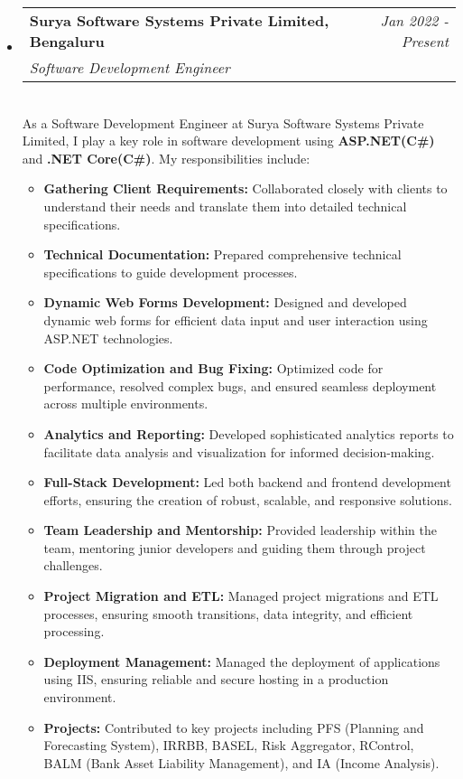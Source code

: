 \documentclass[a4paper,12pt]{article}
\makeatletter
\newcommand{\resumeSubHeadingListStart}{\begin{itemize}[leftmargin=*,labelsep=1mm,noitemsep]}
\newcommand{\resumeSubHeadingListEnd}{\end{itemize}\vspace{2mm}}
\newcommand{\resumeItemListStart}{\begin{itemize}[leftmargin=3ex, rightmargin=2ex, noitemsep,labelsep=1.2mm,itemsep=0mm]\small}
\newcommand{\resumeItemListEnd}{\end{itemize}\vspace{-2mm}}
\newcommand{\resumeExperience}[4]{
\vspace{0.5mm}\item
    \begin{tabular*}{0.98\textwidth}[t]{l@{\extracolsep{\fill}}r}
        \textbf{#1} & \textit{\footnotesize{#3}}\\
        \textit{\footnotesize{#2}} & {}
    \end{tabular*}\\ [1mm]
    \footnotesize{#4}
}
\newcommand{\emptyLine}{\\[-3mm]}
\makeatother
\begin{document}
\resumeSubHeadingListStart
\resumeExperience {Surya Software Systems Private Limited, Bengaluru}
 {Software Development Engineer} {Jan 2022 - Present}
{
As a Software Development Engineer at Surya Software Systems Private Limited, I play a key role in software development using \textbf{ASP.NET(C\#)} and \textbf{.NET Core(C\#)}. My responsibilities include:
}\emptyLine
\resumeItemListStart
    \item \textbf{Gathering Client Requirements:} Collaborated closely with clients to understand their needs and translate them into detailed technical specifications.
    \item \textbf{Technical Documentation:} Prepared comprehensive technical specifications to guide development processes.
    \item \textbf{Dynamic Web Forms Development:} Designed and developed dynamic web forms for efficient data input and user interaction using ASP.NET technologies.
    \item \textbf{Code Optimization and Bug Fixing:} Optimized code for performance, resolved complex bugs, and ensured seamless deployment across multiple environments.
    \item \textbf{Analytics and Reporting:} Developed sophisticated analytics reports to facilitate data analysis and visualization for informed decision-making.
    \item \textbf{Full-Stack Development:} Led both backend and frontend development efforts, ensuring the creation of robust, scalable, and responsive solutions.
    \item \textbf{Team Leadership and Mentorship:} Provided leadership within the team, mentoring junior developers and guiding them through project challenges.
    \item \textbf{Project Migration and ETL:} Managed project migrations and ETL processes, ensuring smooth transitions, data integrity, and efficient processing.
    \item \textbf{Deployment Management:} Managed the deployment of applications using IIS, ensuring reliable and secure hosting in a production environment.
    \item \textbf{Projects:} Contributed to key projects including PFS (Planning and Forecasting System), IRRBB, BASEL, Risk Aggregator, RControl, BALM (Bank Asset Liability Management), and IA (Income Analysis).
    \resumeItemListEnd
\resumeSubHeadingListEnd


\vfill
\end{document}
